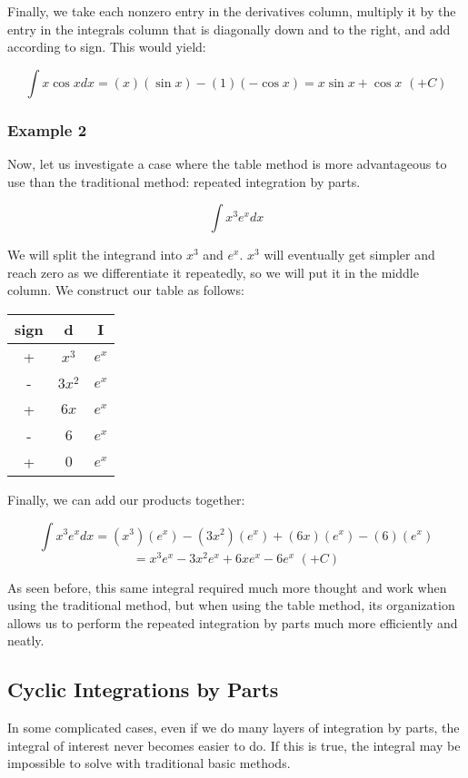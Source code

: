 \documentclass[11pt]{article}
\begin{document}
Finally, we take each nonzero entry in the derivatives column, multiply it by the entry in the integrals column that is diagonally down and to the right, and add according to sign. This would yield:

\[ \int x \cos x dx = (x)(\sin x) - (1)(-\cos x) = x\sin x + \cos x \,\, (+C)\]

\subsubsection*{Example 2}
Now, let us investigate a case where the table method is more advantageous to use than the traditional method: repeated integration by parts.

\[ \int x^3 e^x dx \]

We will split the integrand into $x^3$ and $e^x$. $x^3$ will eventually get simpler and reach zero as we differentiate it repeatedly, so we will put it in the middle column. We construct our table as follows: 

\begin{table}[H]
    \centering
    \begin{tabular}{c|c|c}
        sign & d & I \\
        \hline
        + & $x^3$ & $e^x$ \\
        - & $3x^2$ & $e^x$\\
        + & $6x$ & $e^x$ \\
        - & $6$ & $e^x$ \\
        + & $0$ & $e^x$ \\
    \end{tabular}
\end{table}

Finally, we can add our products together: 

\[ \int x^3e^x dx = (x^3)(e^x) - (3x^2)(e^x) + (6x)(e^x) - (6)(e^x) \]
\[ = x^3e^x - 3x^2e^x + 6xe^x - 6e^x \,\, (+C)\]

As seen before, this same integral required much more thought and work when using the traditional method, but when using the table method, its organization allows us to perform the repeated integration by parts much more efficiently and neatly.

\subsection{Cyclic Integrations by Parts}
In some complicated cases, even if we do many layers of integration by parts, the integral of interest never becomes easier to do. If this is true, the integral may be impossible to solve with traditional basic methods. 
\end{document}
